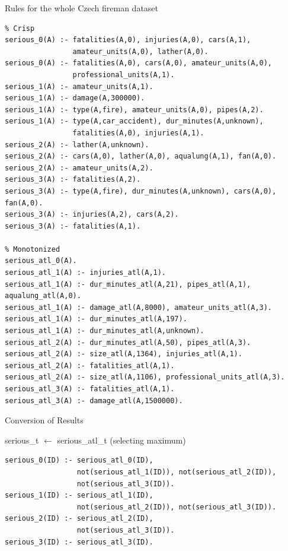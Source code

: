 \documentclass[xcolor=dvipsnames]{beamer}
\begin{document}
\begin{frame}[fragile]{Rules for the whole Czech fireman dataset}
\begin{verbatim}
% Crisp
serious_0(A) :- fatalities(A,0), injuries(A,0), cars(A,1), 
                amateur_units(A,0), lather(A,0).
serious_0(A) :- fatalities(A,0), cars(A,0), amateur_units(A,0),
                professional_units(A,1).
serious_1(A) :- amateur_units(A,1).
serious_1(A) :- damage(A,300000).
serious_1(A) :- type(A,fire), amateur_units(A,0), pipes(A,2).
serious_1(A) :- type(A,car_accident), dur_minutes(A,unknown),
                fatalities(A,0), injuries(A,1).
serious_2(A) :- lather(A,unknown).
serious_2(A) :- cars(A,0), lather(A,0), aqualung(A,1), fan(A,0).
serious_2(A) :- amateur_units(A,2).
serious_3(A) :- fatalities(A,2).
serious_3(A) :- type(A,fire), dur_minutes(A,unknown), cars(A,0), fan(A,0).
serious_3(A) :- injuries(A,2), cars(A,2).
serious_3(A) :- fatalities(A,1).

% Monotonized
serious_atl_0(A).
serious_atl_1(A) :- injuries_atl(A,1).
serious_atl_1(A) :- dur_minutes_atl(A,21), pipes_atl(A,1), aqualung_atl(A,0).
serious_atl_1(A) :- damage_atl(A,8000), amateur_units_atl(A,3).
serious_atl_1(A) :- dur_minutes_atl(A,197).
serious_atl_1(A) :- dur_minutes_atl(A,unknown).
serious_atl_2(A) :- dur_minutes_atl(A,50), pipes_atl(A,3).
serious_atl_2(A) :- size_atl(A,1364), injuries_atl(A,1).
serious_atl_2(A) :- fatalities_atl(A,1).
serious_atl_2(A) :- size_atl(A,1106), professional_units_atl(A,3).
serious_atl_3(A) :- fatalities_atl(A,1).
serious_atl_3(A) :- damage_atl(A,1500000).
\end{verbatim}
\end{frame}



\begin{frame}[fragile]{Conversion of Results}
\begin{block}{serious\_t $\leftarrow$ serious\_atl\_t \phantom{X} (selecting maximum)}
\begin{verbatim}
serious_0(ID) :- serious_atl_0(ID),
                 not(serious_atl_1(ID)), not(serious_atl_2(ID)),
                 not(serious_atl_3(ID)).
serious_1(ID) :- serious_atl_1(ID),
                 not(serious_atl_2(ID)), not(serious_atl_3(ID)).
serious_2(ID) :- serious_atl_2(ID),
                 not(serious_atl_3(ID)).
serious_3(ID) :- serious_atl_3(ID).
\end{verbatim}
\end{block}
\end{frame}
\end{document}
